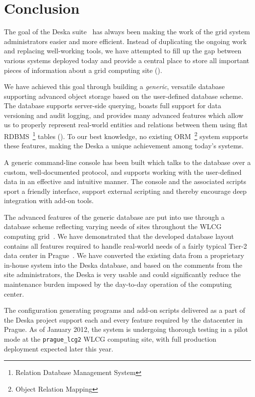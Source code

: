 \documentclass[deska]{subfiles}
\begin{document}
\chapter{Conclusion}
\label{sec:conclusion}

The goal of the Deska suite~\cite{deska-project} has always been making the work of the grid system administrators
easier and more efficient.  Instead of duplicating the ongoing work and replacing well-working tools, we have attempted
to fill up the gap between various systems deployed today and provide a central place to store all important pieces of
information about a grid computing site ().

We have achieved this goal through building a {\em generic}, versatile database supporting advanced object storage based
on the user-defined database scheme.  The database supports server-side querying, boasts full support for data
versioning and audit logging, and provides many advanced features which allow us to properly represent real-world
entities and relations between them using flat RDBMS~\footnote{Relation Database Management System} tables
().  To our best knowledge, no existing ORM~\footnote{Object Relation Mapping} system
supports these features, making the Deska a unique achievement among today's systems.

A generic command-line console has been built which talks to the database over a custom, well-documented protocol, and
supports working with the user-defined data in an effective and intuitive manner.  The console and the associated
scripts sport a friendly interface, support external scripting and thereby encourage deep integration with add-on tools.

The advanced features of the generic database are put into use through a database scheme reflecting varying needs of
sites throughout the WLCG computing grid~\cite{wlcg}.  We have demonstrated that the developed database layout contains
all features required to handle real-world needs of a fairly typical Tier-2 data center in Prague~\cite{farm}.  We have
converted the existing data from a proprietary in-house system into the Deska database, and based on the comments from
the site administrators, the Deska is very usable and could significantly reduce the maintenance burden imposed by the
day-to-day operation of the computing center.

The configuration generating programs and add-on scripts delivered as a part of the Deska project support each and every
feature required by the datacenter in Prague.  As of January 2012, the system is undergoing thorough testing in a pilot
mode at the {\tt prague\_lcg2} WLCG computing site, with full production deployment expected later this year.
\end{document}
